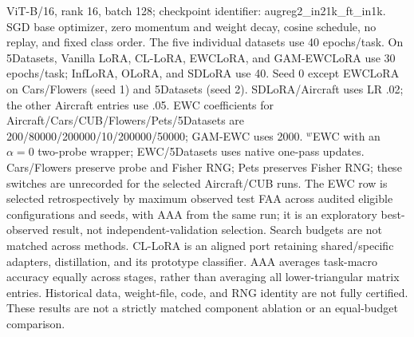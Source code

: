\begin{table}[t]
\begin{minipage}{\linewidth}
ViT-B/16, rank 16, batch 128; checkpoint identifier: augreg2\_in21k\_ft\_in1k. SGD base optimizer, zero momentum and weight decay, cosine schedule, no replay, and fixed class order. The five individual datasets use 40 epochs/task. On 5Datasets, Vanilla LoRA, CL-LoRA, EWCLoRA, and GAM-EWCLoRA use 30 epochs/task; InfLoRA, OLoRA, and SDLoRA use 40. Seed 0 except EWCLoRA on Cars/Flowers (seed 1) and 5Datasets (seed 2). SDLoRA/Aircraft uses LR .02; the other Aircraft entries use .05. EWC coefficients for Aircraft/Cars/CUB/Flowers/Pets/5Datasets are 200/80000/200000/10/200000/50000; GAM-EWC uses 2000. $^{w}$EWC with an $\alpha=0$ two-probe wrapper; EWC/5Datasets uses native one-pass updates. Cars/Flowers preserve probe and Fisher RNG; Pets preserves Fisher RNG; these switches are unrecorded for the selected Aircraft/CUB runs. The EWC row is selected retrospectively by maximum observed test FAA across audited eligible configurations and seeds, with AAA from the same run; it is an exploratory best-observed result, not independent-validation selection. Search budgets are not matched across methods. CL-LoRA is an aligned port retaining shared/specific adapters, distillation, and its prototype classifier. AAA averages task-macro accuracy equally across stages, rather than averaging all lower-triangular matrix entries. Historical data, weight-file, code, and RNG identity are not fully certified. These results are not a strictly matched component ablation or an equal-budget comparison.
\end{minipage}
\end{table}
